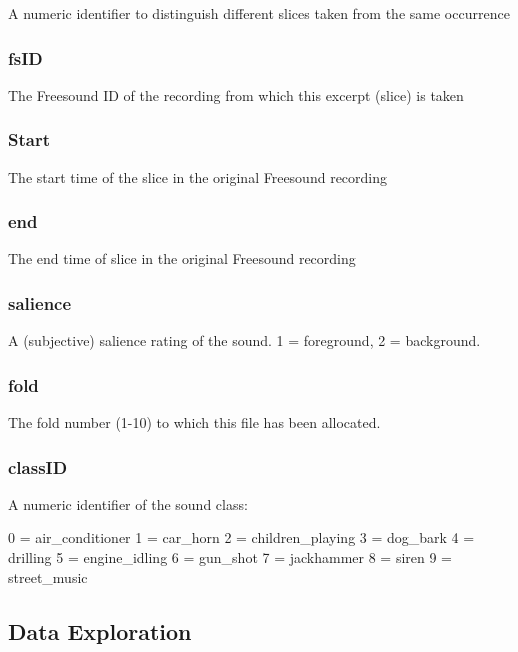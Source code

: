 A numeric identifier to distinguish different slices taken from the same
occurrence

\hypertarget{fsid}{%
\subsubsection{fsID}\label{fsid}}

The Freesound ID of the recording from which this excerpt (slice) is
taken

\hypertarget{start}{%
\subsubsection{Start}\label{start}}

The start time of the slice in the original Freesound recording

\hypertarget{end}{%
\subsubsection{end}\label{end}}

The end time of slice in the original Freesound recording

\hypertarget{salience}{%
\subsubsection{salience}\label{salience}}

A (subjective) salience rating of the sound. 1 = foreground, 2 =
background.

\hypertarget{fold}{%
\subsubsection{fold}\label{fold}}

The fold number (1-10) to which this file has been allocated.

\hypertarget{classid}{%
\subsubsection{classID}\label{classid}}

A numeric identifier of the sound class:

0 = air\_conditioner 1 = car\_horn 2 = children\_playing 3 = dog\_bark 4
= drilling 5 = engine\_idling 6 = gun\_shot 7 = jackhammer 8 = siren 9 =
street\_music

\hypertarget{data-exploration}{%
\subsection{Data Exploration}\label{data-exploration}}

